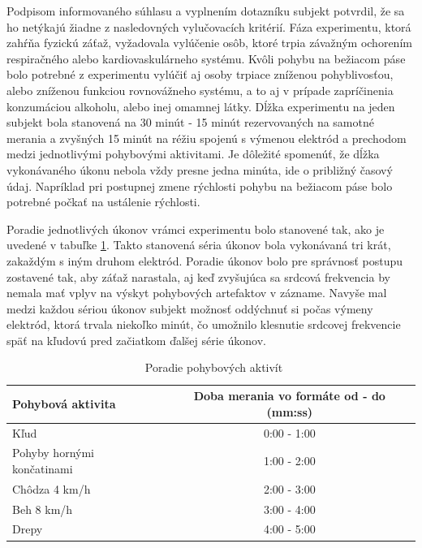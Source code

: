 Podpisom informovaného súhlasu a vyplnením dotazníku subjekt potvrdil, že sa ho netýkajú žiadne z nasledovných vylučovacích kritérií. Fáza experimentu, ktorá zahŕňa fyzickú záťaž, vyžadovala vylúčenie osôb, ktoré trpia závažným ochorením respiračného alebo kardiovaskulárneho systému. Kvôli pohybu na bežiacom páse bolo potrebné z experimentu vylúčiť aj osoby trpiace zníženou pohyblivosťou, alebo zníženou funkciou rovnovážneho systému, a to aj v prípade zapríčinenia konzumáciou alkoholu, alebo inej omamnej látky. Dĺžka experimentu na jeden subjekt bola stanovená na 30 minút - 15 minút rezervovaných na samotné merania a zvyšných 15 minút na réžiu spojenú s výmenou elektród a prechodom medzi jednotlivými pohybovými aktivitami. Je dôležité spomenúť, že dĺžka vykonávaného úkonu nebola vždy presne jedna minúta, ide o približný časový údaj. Napríklad pri postupnej zmene rýchlosti pohybu na bežiacom páse bolo potrebné počkať na ustálenie rýchlosti.

Poradie jednotlivých úkonov vrámci experimentu bolo stanovené tak, ako je uvedené v tabuľke \ref{tab:activities}. Takto stanovená séria úkonov bola vykonávaná tri krát, zakaždým s iným druhom elektród. Poradie úkonov bolo pre správnosť postupu zostavené tak, aby záťaž narastala, aj keď zvyšujúca sa srdcová frekvencia by nemala mať vplyv na výskyt pohybových artefaktov v zázname. Navyše mal medzi každou sériou úkonov subjekt možnosť oddýchnuť si počas výmeny elektród, ktorá trvala niekoľko minút, čo umožnilo klesnutie srdcovej frekvencie späť na kľudovú pred začiatkom ďalšej série úkonov. 

\begin{table}[H]\centering
\caption[Poradie pohybových aktivít]{~Poradie pohybových aktivít}\label{tab:activities}
    \begin{tabular}{l|c}
    	\textbf{Pohybová aktivita}  & \textbf{Doba merania vo formáte od - do (mm:ss)}        \tabularnewline \hline 
     	Kľud                        & 0:00 - 1:00                                   \tabularnewline \hline
     	Pohyby hornými končatinami	& 1:00 - 2:00                                   \tabularnewline \hline
        Chôdza 4 km/h           	& 2:00 - 3:00                                   \tabularnewline \hline
        Beh	8 km/h                  & 3:00 - 4:00                                   \tabularnewline \hline
        Drepy	                    & 4:00 - 5:00                                   \tabularnewline 
    \end{tabular}
\end{table}

